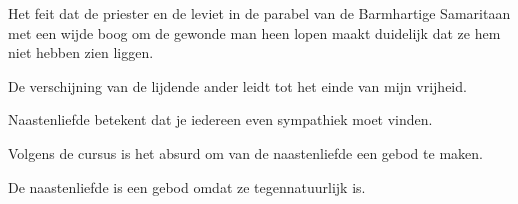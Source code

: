 \documentclass[main.tex]{subfiles}
\begin{document}
\begin{examenvraag}
    \begin{stelling}
        Het feit dat de priester en de leviet in de parabel van de Barmhartige Samaritaan met een wijde boog om de gewonde man heen lopen maakt duidelijk dat ze hem niet hebben zien liggen.
    \end{stelling}

    \begin{antwoord}
    \end{antwoord}
\end{examenvraag}


\begin{examenvraag}
    \begin{stelling}
        De verschijning van de lijdende ander leidt tot het einde van mijn vrijheid.
    \end{stelling}

    \begin{antwoord}
    \end{antwoord}
\end{examenvraag}


\begin{examenvraag}
    \begin{stelling}
        Naastenliefde betekent dat je iedereen even sympathiek moet vinden.
    \end{stelling}

    \begin{antwoord}
    \end{antwoord}
\end{examenvraag}


\begin{examenvraag}
    \begin{stelling}
        Volgens de cursus is het absurd om van de naastenliefde een gebod te maken.
    \end{stelling}

    \begin{antwoord}
    \end{antwoord}
\end{examenvraag}


\begin{examenvraag}
    \begin{stelling}
        De naastenliefde is een gebod omdat ze tegennatuurlijk is.
    \end{stelling}

    \begin{antwoord}
    \end{antwoord}
\end{examenvraag}
\end{document}

